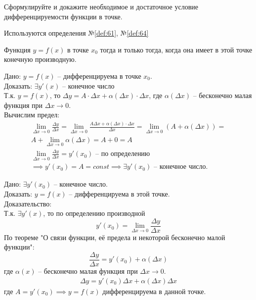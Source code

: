 \begin{question}
    Сформулируйте и докажите необходимое и достаточное условие дифференцируемости функции в точке.
\end{question}
\begin{used}
    Используются определения №\ref{def:61}, №\ref{def:64}
\end{used}
\begin{theorem}
    Функция $y = f(x)$ в точке  $x_0$ тогда и только тогда, когда она имеет в этой точке конечную производную.
\end{theorem}
\begin{necessity}
    Дано: $y = f(x)$ -- дифференцируема в точке  $x_0$. \\
    Доказать: $\exists  y'(x)$ -- конечное число \\
    Т.к. $y = f(x)$, то  $\Delta y = A \cdot \Delta x + \alpha(\Delta x) \cdot \Delta x$, где $\alpha(\Delta x)$ -- бесконечно малая функция при $\Delta x \to 0$. \\
    Вычислим предел: 
    \begin{gather*}
        \lim_{\Delta x \to 0} \frac{\Delta y}{\Delta x} = \lim_{\Delta x \to 0} \frac{A \Delta x + \alpha(\Delta x) \cdot \Delta x}{\Delta x} = \lim_{\Delta x \to 0} \left( A + \alpha(\Delta x) \right)  = \\
        A + \lim_{\Delta x \to 0} \alpha(\Delta x) = A + 0 = A \\
        \lim_{\Delta x \to 0} \frac{\Delta y}{\Delta x} = y'(x_0) \text{ -- по определению} \\
        \implies y'(x_0) = A = const \implies \exists  y'(x_0) \text{ -- конечное число}.
    \end{gather*}
\end{necessity}
\begin{sufficiency}
    Дано: $\exists y'(x_0)$ -- конечное число. \\
    Доказать: $y = f(x)$ -- дифференцируема в этой точке. \\
    Доказательство: \\
    Т.к. $\exists y'(x)$, то по определению производной  \[
        y'(x_{0}) = \lim_{\Delta x \to 0} \frac{\Delta y}{\Delta x}
    \]
    По теореме "О связи функции, её предела и некоторой бесконечно малой функции": \[
    \frac{\Delta y}{\Delta x} = y'(x_0) + \alpha(\Delta x)
    \] 
    где $\alpha(x)$ -- бесконечно малая функция при $\Delta x \to 0$.
    \begin{gather*}
        \Delta y = y'(x_0) \Delta x + \alpha(\Delta x) \Delta x
    \end{gather*}
    где $A = y'(x_0) \implies y = f(x)$ дифференцируема в данной точке.
\end{sufficiency}
\pagebreak




